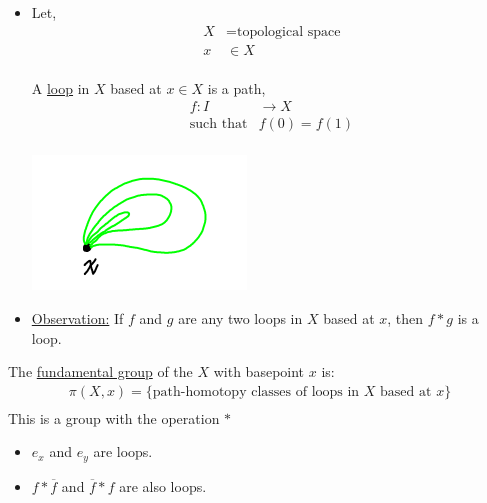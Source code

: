 \begin{itemize}
\begin{itemize}
        \item Let,
            \begin{align*}
                X&=\text{topological space}\\
                x&\in X\\
            \end{align*}
            \begin{definition} A \underline{loop} in $X$ based at $x\in X$ is a path,
            \begin{align*}
                f:I&\rightarrow X\\
                \text{such that}
                &f(0)=f(1)\\
            \end{align*}
            \end{definition}
            \begin{minipage}[c]{\linewidth}
                \begin{center}
                \includegraphics[]{images/loops.png}
                \end{center}
            \end{minipage}
        \item \underline{Observation:} If $f$ and $g$ are any two loops in $X$ based at $x$,
            then $f*g$ is a loop.
    \end{itemize}
            \begin{definition}
                The \underline{fundamental group} of the $X$ with basepoint $x$ is:
                \begin{align*}
                    \pi(X,x)=\{\text{path-homotopy classes of loops in $X$ based at $x$}\}\\
                \end{align*}
                This is a group with the operation $*$\\
            \end{definition}
    \begin{itemize}
        \item $e_x$ and $e_y$ are loops.
        \item $f*\overline{f}$ and $\overline{f}*f$ are also loops.

\end{itemize}
\end{itemize}

